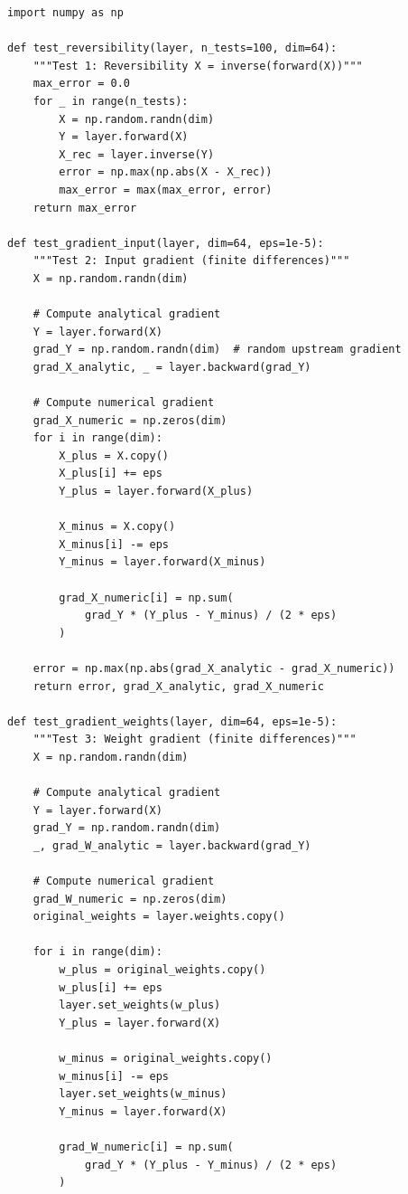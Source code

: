 \documentclass[11pt,a4paper]{report}
\begin{document}
\label{app:ch2-lst4}
\begin{lstlisting}[caption={Reversibility and gradient correctness tests}]
import numpy as np

def test_reversibility(layer, n_tests=100, dim=64):
    """Test 1: Reversibility X = inverse(forward(X))"""
    max_error = 0.0
    for _ in range(n_tests):
        X = np.random.randn(dim)
        Y = layer.forward(X)
        X_rec = layer.inverse(Y)
        error = np.max(np.abs(X - X_rec))
        max_error = max(max_error, error)
    return max_error

def test_gradient_input(layer, dim=64, eps=1e-5):
    """Test 2: Input gradient (finite differences)"""
    X = np.random.randn(dim)
    
    # Compute analytical gradient
    Y = layer.forward(X)
    grad_Y = np.random.randn(dim)  # random upstream gradient
    grad_X_analytic, _ = layer.backward(grad_Y)
    
    # Compute numerical gradient
    grad_X_numeric = np.zeros(dim)
    for i in range(dim):
        X_plus = X.copy()
        X_plus[i] += eps
        Y_plus = layer.forward(X_plus)
        
        X_minus = X.copy()
        X_minus[i] -= eps
        Y_minus = layer.forward(X_minus)
        
        grad_X_numeric[i] = np.sum(
            grad_Y * (Y_plus - Y_minus) / (2 * eps)
        )
    
    error = np.max(np.abs(grad_X_analytic - grad_X_numeric))
    return error, grad_X_analytic, grad_X_numeric

def test_gradient_weights(layer, dim=64, eps=1e-5):
    """Test 3: Weight gradient (finite differences)"""
    X = np.random.randn(dim)
    
    # Compute analytical gradient
    Y = layer.forward(X)
    grad_Y = np.random.randn(dim)
    _, grad_W_analytic = layer.backward(grad_Y)
    
    # Compute numerical gradient
    grad_W_numeric = np.zeros(dim)
    original_weights = layer.weights.copy()
    
    for i in range(dim):
        w_plus = original_weights.copy()
        w_plus[i] += eps
        layer.set_weights(w_plus)
        Y_plus = layer.forward(X)
        
        w_minus = original_weights.copy()
        w_minus[i] -= eps
        layer.set_weights(w_minus)
        Y_minus = layer.forward(X)
        
        grad_W_numeric[i] = np.sum(
            grad_Y * (Y_plus - Y_minus) / (2 * eps)
        )
    

\end{lstlisting}
\end{document}
